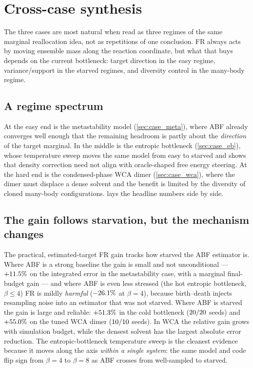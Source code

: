 \section{Cross-case synthesis}
\label{sec:synthesis}

The three cases are most natural when read as three regimes of the same marginal
reallocation idea, not as repetitions of one conclusion. FR always acts by moving
ensemble mass along the reaction coordinate, but what that buys depends on the
current bottleneck: target direction in the easy regime, variance/support in the
starved regimes, and diversity control in the many-body regime.

\subsection{A regime spectrum}
At the easy end is the metastability model (\cref{sec:case_meta}), where ABF
already converges well enough that the remaining headroom is partly about the
\emph{direction} of the target marginal. In the middle is the entropic bottleneck
(\cref{sec:case_eb}), whose temperature sweep moves the same model from easy to
starved and shows that density correction need not align with oracle-shaped free
energy steering. At the hard end is the condensed-phase WCA dimer
(\cref{sec:case_wca}), where the dimer must displace a dense solvent and the
benefit is limited by the diversity of cloned many-body configurations.
 lays the headline numbers side by side.



\subsection{The gain follows starvation, but the mechanism changes}
The practical, estimated-target FR gain tracks how starved the ABF estimator is.
Where ABF is a strong baseline the gain is small and not unconditional ---
$+11.5\%$ on the integrated error in the metastability case, with a
marginal final-budget gain --- and where ABF is even less stressed (the hot
entropic bottleneck, $\beta\le4$) FR is mildly \emph{harmful}
($-26.1\%$ at $\beta=4$), because birth--death injects resampling
noise into an estimator that was not starved. Where ABF is starved the gain is
large and reliable: $+51.3\%$ in the cold bottleneck ($20/20$
seeds) and $+55.0\%$ on the tuned WCA dimer ($10/10$ seeds).
In WCA the relative gain grows with simulation budget, while the densest solvent
has the largest absolute error reduction. The entropic-bottleneck temperature
sweep is the cleanest evidence because it moves along the axis \emph{within a
single system}: the same model and code flip sign from $\beta=4$ to $\beta=8$ as
ABF crosses from well-sampled to starved.

